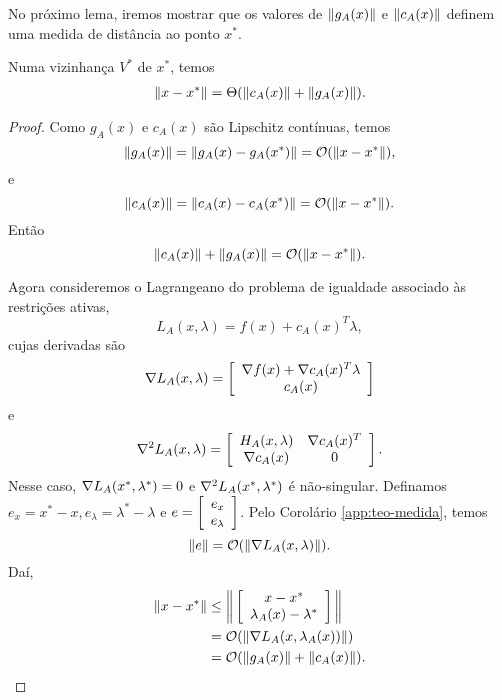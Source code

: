 No próximo lema, iremos mostrar que os valores de $\Vert g_A(x)\Vert$ e $\Vert c_A(x)\Vert$ definem 
uma medida de distância ao ponto $x^*$.
\begin{lemma}
 Numa vizinhança $V^*$ de $x^*$, temos
\begin{eqnarray}
 \norma{x - x^*} = \Theta(\norma{c_A(x)} + \norma{g_A(x)}). \visiblelbl{eq:difxTheta}
\visiblelbl{eq:difzTheta}
\end{eqnarray}
\end{lemma}
\begin{proof}
Como $g_A(x)$ e $c_A(x)$ são Lipschitz contínuas, temos
$$ \Vert g_A(x)\Vert = \Vert g_A(x) - g_A(x^*)\Vert = \mathcal{O}(\Vert x-x^*\Vert),$$
e
$$ \Vert c_A(x)\Vert = \Vert c_A(x) - c_A(x^*)\Vert = \mathcal{O}(\Vert x-x^*\Vert).$$
Então
  $$\Vert c_A(x)\Vert + \Vert g_A(x)\Vert = \mathcal{O}(\Vert x-x^*\Vert).$$

Agora consideremos o Lagrangeano do problema de igualdade associado às
restrições ativas,
$$L_A(x,\lambda) = f(x) + c_A(x)^T\lambda,$$
cujas derivadas são
$$ \nabla L_A(x,\lambda) = 
\left[\begin{array}{c}\nabla f(x) + \nabla c_A(x)^T\lambda \\ c_A(x)\end{array}\right]$$
e
$$\nabla^2 L_A(x,\lambda) = 
\left[\begin{array}{cc}H_A(x,\lambda) & \nabla c_A(x)^T \\ \nabla c_A(x) & 0\end{array}\right].$$
Nesse caso, $\nabla L_A(x^*,\lambda^{*}) = 0$ e $\nabla^2 L_A(x^*, \lambda^{*})$ é
não-singular.
Definamos $e_x = x^* - x, e_\lambda = \lambda^* - \lambda$ e
$e = \left[\begin{array}{c}e_x \\ e_\lambda\end{array}\right]$.
Pelo Corolário \ref{app:teo-medida}, temos
$$ \Vert e\Vert = 
\mathcal{O}(\Vert \nabla L_A(x,\lambda)\Vert). $$
Daí,
\begin{align*}
\Vert x - x^*\Vert 
  & \leq \bigg\Vert \left[\begin{array}{c}x - x^* \\ \lambda_A(x) - \lambda^*\end{array}\right]\bigg\Vert \\
  & = \mathcal{O}(\Vert \nabla L_A(x,\lambda_A(x))\Vert) \\
  & = \mathcal{O}(\Vert g_A(x)\Vert + \Vert c_A(x)\Vert).
\end{align*}
\end{proof}

